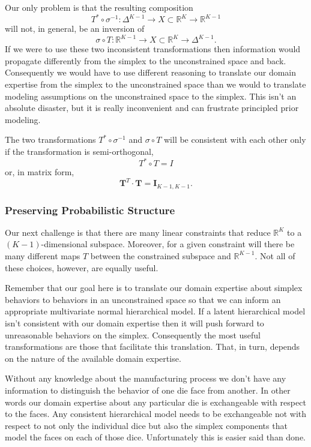 \documentclass[
  letterpaper,
  DIV=11,
  numbers=noendperiod]{scrartcl}
\begin{document}
Our only problem is that the resulting composition \[
T^{*} \circ \sigma^{-1} :
\Delta^{K - 1} \rightarrow X
\subset \mathbb{R}^{K} \rightarrow \mathbb{R}^{K - 1}
\] will not, in general, be an inversion of \[
\sigma \circ T:
\mathbb{R}^{K - 1} \rightarrow
X \subset \mathbb{R}^{K} \rightarrow \Delta^{K - 1}.
\] If we were to use these two inconsistent transformations then
information would propagate differently from the simplex to the
unconstrained space and back. Consequently we would have to use
different reasoning to translate our domain expertise from the simplex
to the unconstrained space than we would to translate modeling
assumptions on the unconstrained space to the simplex. This isn't an
absolute disaster, but it is really inconvenient and can frustrate
principled prior modeling.

The two transformations \(T^{*} \circ \sigma^{-1}\) and
\(\sigma \circ T\) will be consistent with each other only if the
transformation is semi-orthogonal, \[
T^{*} \circ T = I
\] or, in matrix form, \[
\mathbf{T}^{T} \cdot \mathbf{T} = \mathbf{I}_{K - 1, K - 1}.
\]

\subsubsection{Preserving Probabilistic
Structure}\label{preserving-probabilistic-structure}

Our next challenge is that there are many linear constraints that reduce
\(\mathbb{R}^{K}\) to a \((K - 1)\)-dimensional subspace. Moreover, for
a given constraint will there be many different maps \(T\) between the
constrained subspace and \(\mathbb{R}^{K - 1}\). Not all of these
choices, however, are equally useful.

Remember that our goal here is to translate our domain expertise about
simplex behaviors to behaviors in an unconstrained space so that we can
inform an appropriate multivariate normal hierarchical model. If a
latent hierarchical model isn't consistent with our domain expertise
then it will push forward to unreasonable behaviors on the simplex.
Consequently the most useful transformations are those that facilitate
this translation. That, in turn, depends on the nature of the available
domain expertise.

Without any knowledge about the manufacturing process we don't have any
information to distinguish the behavior of one die face from another. In
other words our domain expertise about any particular die is
exchangeable with respect to the faces. Any consistent hierarchical
model needs to be exchangeable not with respect to not only the
individual dice but also the simplex components that model the faces on
each of those dice. Unfortunately this is easier said than done.
\end{document}
